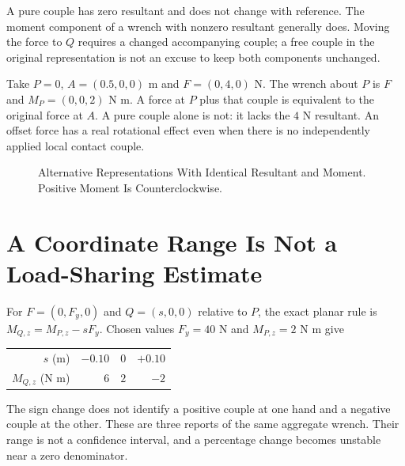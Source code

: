 \documentclass[11pt,a4paper]{article}
\begin{document}
A pure couple has zero resultant and does not change with reference. The moment component of a wrench with nonzero resultant generally does. Moving the force to $Q$ requires a changed accompanying couple; a free couple in the original representation is not an excuse to keep both components unchanged.

Take $P=0$, $A=(0.5,0,0)$ m and $F=(0,4,0)$ N. The wrench about $P$ is $F$ and $M_P=(0,0,2)$ N m. A force at $P$ plus that couple is equivalent to the original force at $A$. A pure couple alone is not: it lacks the $4$ N resultant. An offset force has a real rotational effect even when there is no independently applied local contact couple.

\begin{figure}[htbp]\centering
{}
\caption{Alternative Representations With Identical Resultant and Moment. Positive Moment Is Counterclockwise.}
\end{figure}

\section{A Coordinate Range Is Not a Load-Sharing Estimate}
For $F=(0,F_y,0)$ and $Q=(s,0,0)$ relative to $P$, the exact planar rule is
$M_{Q,z}=M_{P,z}-sF_y$. Chosen values $F_y=40$ N and $M_{P,z}=2$ N m give
\begin{center}\begin{tabular}{rrrr}\toprule
$s$ (m) & $-0.10$ & $0$ & $+0.10$\\
$M_{Q,z}$ (N m) & $6$ & $2$ & $-2$\\\bottomrule
\end{tabular}\end{center}
The sign change does not identify a positive couple at one hand and a negative couple at the other. These are three reports of the same aggregate wrench. Their range is not a confidence interval, and a percentage change becomes unstable near a zero denominator.
\end{document}
